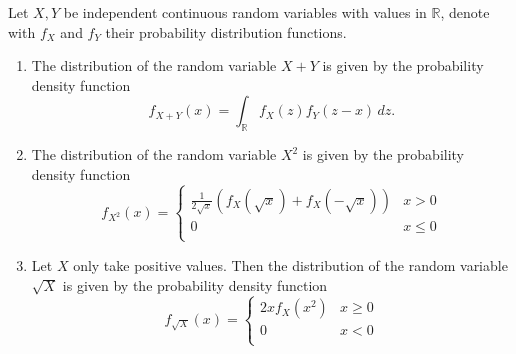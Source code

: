 \begin{lemma} \label{lemma:transform_random_variable} 
  Let $X,Y$ be independent continuous random variables with values in
  $\mathbb{R}$, denote with $f_X$ and $f_Y$ their probability
  distribution functions.%
  \begin{enumerate}[label=(\arabic*),ref=(\arabic*), itemsep=-0.6cm]
    \item The distribution of the random variable $X+Y$ is given by
      the probability density function%
      \[%
        f_{X+Y}(x) = \int_{\mathbb{R}} f_X(z) f_Y(z-x)\, dz.  
      \]%
    \item The distribution of the random variable $X^2$ is given by
      the probability density function
      \[
        f_{X^2}(x) = %
        \begin{cases} 
          \frac{1}{2\sqrt{x}}\left(f_X(\sqrt{x})+f_X(-\sqrt{x})\right)
           & x > 0 \\           0     & x \leq 0 \\
        \end{cases}
      \]
    \item Let $X$ only take positive values. Then the distribution of
      the random variable $\sqrt{X}$ is given by the probability
      density function
      \[
        f_{\sqrt{X}}(x) = %
        \begin{cases}
          2x f_X(x^2) & x \geq 0 \\0   & x < 0 \\
        \end{cases}
      \]
  \end{enumerate}
\end{lemma}
%

